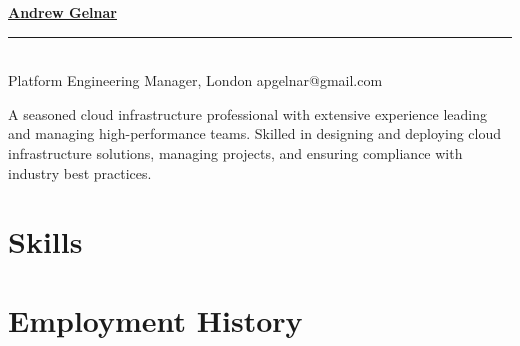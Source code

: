 \documentclass[10pt]{article} %
\begin{document}

{\huge{\textbf{\href{https://github.com/neoshrew/CV/blob/master/andrew_gelnar_cv.pdf}{Andrew Gelnar}}}}
\\
\rule{\textwidth}{0.5mm}
\\
Platform Engineering Manager, London
\hfill
apgelnar@gmail.com


A seasoned cloud infrastructure professional with extensive experience leading and managing
high-performance teams.
Skilled in designing and deploying cloud infrastructure solutions, managing projects, and
ensuring compliance with industry best practices.


\vspace{-5mm}
\section{Skills}


\section{Employment History}
\end{document}
